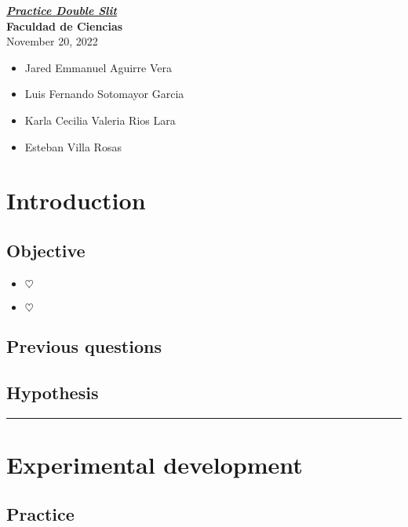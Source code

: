 \documentclass[a4paper,12pt]{article}
\begin{document}
\begin{center}

{\Huge{{\textbf{\emph{\underline{Practice Double Slit
}}}}}}\\

\Large{\textbf{Faculdad de Ciencias}}\\
{\small{November 20, 2022}}

\end{center}
\begin{itemize}
    \item Jared Emmanuel Aguirre Vera
    \item Luis Fernando Sotomayor Garcia
    \item Karla Cecilia Valeria Rios Lara 
    \item Esteban Villa Rosas
\end{itemize}

\date{November 2022}

\begin{abstract}
    \blindtext
\end{abstract}
\section{\Large{Introduction}}
\subsection{Objective}
\begin{itemize}
    \item $\heartsuit$ \blindtext
    \item $\heartsuit$ \blindtext
\end{itemize}
\subsection{Previous questions}
\blindtext
\subsection{Hypothesis}
\bigskip
\hrule 
\smallskip
\bigskip

    \lipsum[1-4]


\section{\Large{Experimental development}}
\subsection{Practice}
    \lipsum[3-7]
\end{document}
